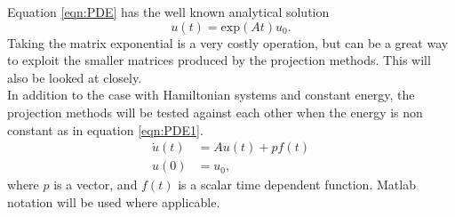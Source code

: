 Equation \eqref{eqn:PDE} has the well known analytical solution 
\begin{equation*}
u(t) = \text{exp}(At)u_0.
\end{equation*}
Taking the matrix exponential is a very costly operation, but can be a great way to exploit the smaller matrices produced by the projection methods. This will also be looked at closely.\\
In addition to the case with Hamiltonian systems and constant energy, the projection methods will be tested against each other when the energy is non constant as in equation \eqref{eqn:PDE1}.
\begin{equation}
\begin{aligned}
\dot{u}(t) &= A u(t) + p f(t)\\
u(0)&= u_0,
\end{aligned}
\label{eqn:PDE1}
\end{equation}
where $p$ is a vector, and $f(t)$ is a scalar time dependent function.
Matlab notation will be used where applicable.\\

